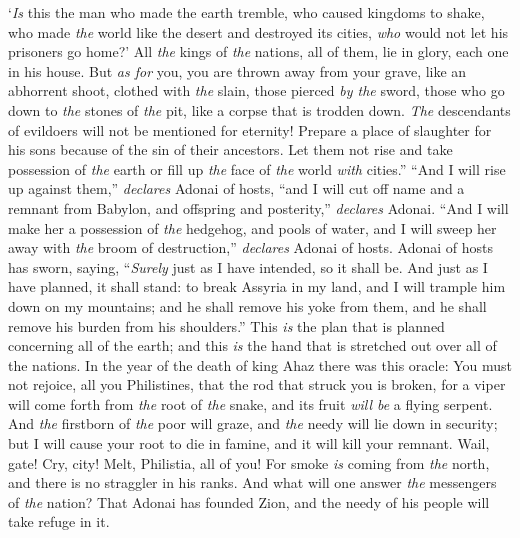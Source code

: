 \begin{biblechapter}
‘\textit{Is} this the man who made the earth tremble, 
who caused kingdoms to shake,
\verse who made \textit{the} world like the desert 
and destroyed its cities, 
\textit{who} would not let his prisoners go home?’
\verse All \textit{the} kings of \textit{the} nations, all of them, lie in glory, 
each one in his house.
\verse But \textit{as for} you, you are thrown away from your grave, 
like an abhorrent shoot, 
clothed with \textit{the} slain, 
those pierced \textit{by the} sword, 
those who go down to \textit{the} stones of \textit{the} pit, 
like a corpse that is trodden down. \textit{The} descendants of evildoers will not be mentioned for eternity!
\verse Prepare a place of slaughter for his sons 
because of the sin of their ancestors. 
Let them not rise and take possession of \textit{the} earth 
or fill up \textit{the} face of \textit{the} world \textit{with} cities.”
\verse “And I will rise up against them,” \textit{declares} Adonai of hosts, “and I will cut off name and a remnant from Babylon, 
and offspring and posterity,” \textit{declares} Adonai.
\verse “And I will make her a possession of \textit{the} hedgehog, 
and pools of water, 
and I will sweep her away with \textit{the} broom of destruction,” \textit{declares} Adonai of hosts.
 Adonai of hosts has sworn, saying,
\verse “\textit{Surely} just as I have intended, so it shall be. 
And just as I have planned, it shall stand:
\verse to break Assyria in my land, 
and I will trample him down on my mountains; 
and he shall remove his yoke from them, 
and he shall remove his burden from his shoulders.”
\verse This \textit{is} the plan that is planned concerning all of the earth; 
and this \textit{is} the hand that is stretched out over all of the nations.
 In the year of the death of king Ahaz there was this oracle:
\verse You must not rejoice, all you Philistines, 
that the rod that struck you is broken, 
for a viper will come forth from \textit{the} root of \textit{the} snake, 
and its fruit \textit{will be} a flying serpent.
\verse And \textit{the} firstborn of \textit{the} poor will graze, 
and \textit{the} needy will lie down in security; 
but I will cause your root to die in famine, 
and it will kill your remnant.
\verse Wail, gate! Cry, city! 
Melt, Philistia, all of you! 
For smoke \textit{is} coming from \textit{the} north, 
and there is no straggler in his ranks.
\verse And what will one answer \textit{the} messengers of \textit{the} nation? That Adonai has founded Zion, 
and the needy of his people will take refuge in it.
\end{biblechapter}

